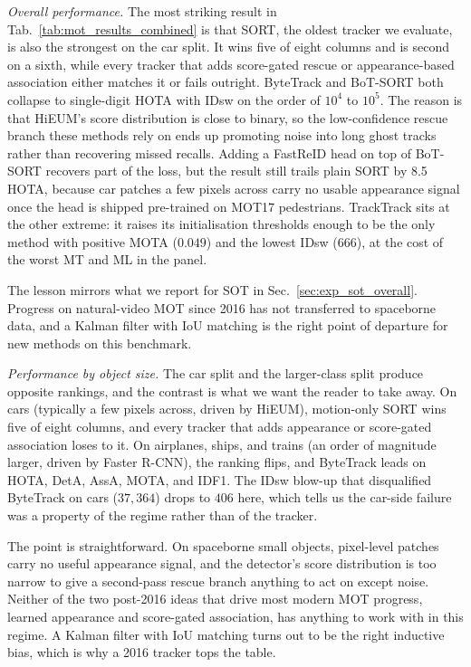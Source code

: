 \documentclass{article}
\newcommand{\minihead}[1]{\noindent\textit{#1.}}
\begin{document}
\minihead{Overall performance}
\label{sec:exp_mot_overall}
The most striking result in Tab.~\ref{tab:mot_results_combined} is that
SORT, the oldest tracker we evaluate, is also the strongest on the car
split. It wins five of eight columns and is second on a sixth, while
every tracker that adds score-gated rescue or appearance-based
association either matches it or fails outright. ByteTrack and BoT-SORT
both collapse to single-digit HOTA with IDsw on the order of $10^4$
to $10^5$. The reason is that HiEUM's score distribution is close to
binary, so the low-confidence rescue branch these methods rely on ends
up promoting noise into long ghost tracks rather than recovering missed
recalls. Adding a FastReID head on top of BoT-SORT recovers part of
the loss, but the result still trails plain SORT by 8.5 HOTA, because
car patches a few pixels across carry no usable appearance signal once
the head is shipped pre-trained on MOT17 pedestrians. TrackTrack sits
at the other extreme: it raises its initialisation thresholds enough
to be the only method with positive MOTA ($0.049$) and the lowest
IDsw ($666$), at the cost of the worst MT and ML in the panel.

The lesson mirrors what we report for SOT in Sec.~\ref{sec:exp_sot_overall}.
Progress on natural-video MOT since 2016 has not transferred to
spaceborne data, and a Kalman filter with IoU matching is the right
point of departure for new methods on this benchmark.

\minihead{Performance by object size}
\label{sec:exp_mot_size}
The car split and the larger-class split produce opposite rankings,
and the contrast is what we want the reader to take away. On cars
(typically a few pixels across, driven by HiEUM), motion-only SORT
wins five of eight columns, and every tracker that adds appearance or
score-gated association loses to it. On airplanes, ships, and trains
(an order of magnitude larger, driven by Faster R-CNN), the ranking
flips, and ByteTrack leads on HOTA, DetA, AssA, MOTA, and IDF1. The
IDsw blow-up that disqualified ByteTrack on cars ($37{,}364$) drops to
$406$ here, which tells us the car-side failure was a property of the
regime rather than of the tracker.

The point is straightforward. On spaceborne small objects, pixel-level
patches carry no useful appearance signal, and the detector's score
distribution is too narrow to give a second-pass rescue branch anything
to act on except noise. Neither of the two post-2016 ideas that drive
most modern MOT progress, learned appearance and score-gated
association, has anything to work with in this regime. A Kalman filter
with IoU matching turns out to be the right inductive bias, which is
why a 2016 tracker tops the table.
\end{document}
